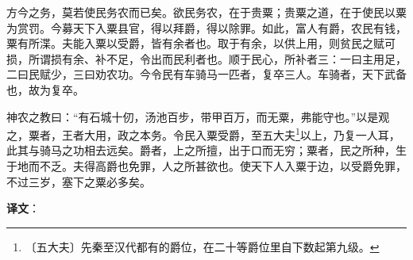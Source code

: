 \documentclass[12pt,UTF-8,openany]{ctexbook}
\begin{document}
\begin{normalsize}
    方今之务，莫若使民务农而已矣。欲民务农，在于贵粟；贵粟之道，在于使民以粟为赏罚。今募天下入粟县官，得以拜爵，得以除罪。如此，富人有爵，农民有钱，粟有所渫。夫能入粟以受爵，皆有余者也。取于有余，以供上用，则贫民之赋可损，所谓损有余、补不足，令出而民利者也。顺于民心，所补者三：一曰主用足，二曰民赋少，三曰劝农功。今令民有车骑马一匹者，复卒三人。车骑者，天下武备也，故为复卒。
    
    神农之教曰：“有石城十仞，汤池百步，带甲百万，而无粟，弗能守也。”以是观之，粟者，王者大用，政之本务。令民入粟受爵，至五大夫\footnote{〔五大夫〕先秦至汉代都有的爵位，在二十等爵位里自下数起第九级。}以上，乃复一人耳，此其与骑马之功相去远矣。爵者，上之所擅，出于口而无穷；粟者，民之所种，生于地而不乏。夫得高爵也免罪，人之所甚欲也。使天下人入粟于边，以受爵免罪，不过三岁，塞下之粟必多矣。
\end{normalsize}


\newpage

\textbf{译文}：

\vspace{1em}
\end{document}
